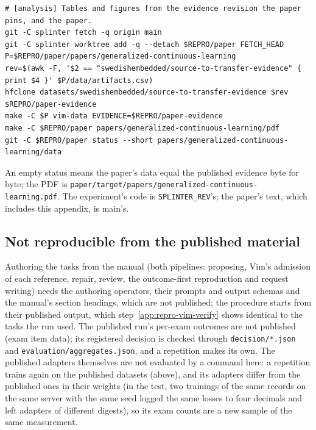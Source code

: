 {\scriptsize
\begin{verbatim}
# [analysis] Tables and figures from the evidence revision the paper pins, and the paper.
git -C splinter fetch -q origin main
git -C splinter worktree add -q --detach $REPRO/paper FETCH_HEAD
P=$REPRO/paper/papers/generalized-continuous-learning
rev=$(awk -F, '$2 == "swedishembedded/source-to-transfer-evidence" { print $4 }' $P/data/artifacts.csv)
hfclone datasets/swedishembedded/source-to-transfer-evidence $rev $REPRO/paper-evidence
make -C $P vim-data EVIDENCE=$REPRO/paper-evidence
make -C $REPRO/paper papers/generalized-continuous-learning/pdf
git -C $REPRO/paper status --short papers/generalized-continuous-learning/data
\end{verbatim}
}

\begin{sloppypar}
An empty status means the paper's data equal the published evidence byte for byte; the PDF is
\texttt{paper/target/papers/generalized-continuous-learning.pdf}. The experiment's code is \texttt{SPLINTER\_REV}'s; the
paper's text, which includes this appendix, is main's.
\end{sloppypar}

\subsection{Not reproducible from the published material}\label{app:repro-vim-limits}

\begin{sloppypar}
Authoring the tasks from the manual (both pipelines: proposing, Vim's admission of each reference, repair, review, the
outcome-first reproduction and request writing) needs the authoring operators, their prompts and output schemas and the
manual's section headings, which are not published; the procedure starts from their published output, which
step~\ref{app:repro-vim-verify} shows identical to the tasks the run used. The published run's per-exam outcomes are not
published (exam item data); its registered decision is checked through \texttt{decision/*.json} and
\texttt{evaluation/aggregates.json}, and a repetition makes its own. The published adapters themselves are not evaluated by a command
here: a repetition trains again on the published datasets (above), and its adapters differ from the published ones in their
weights (in the test, two trainings of the same records on the same server with the same seed logged the same losses to four
decimals and left adapters of different digests), so its exam counts are a new sample of the same measurement.
\end{sloppypar}

